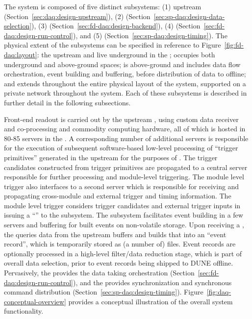 The   system is composed of five distinct subsystems:
%
(1) upstream  (Section~\ref{sec:daq:design-upstream}),
%
(2)  (Section~\ref{sec:sp-daq:design-data-selection}),
%
(3)  (Section~\ref{sec:fd-daq:design-backend}), 
%
(4)  (Section~\ref{sec:fd-daq:design-run-control}), and
%
(5)  (Section~\ref{sec:sp-daq:design-timing}).
%
The physical extent of the subsystems
can be specified in reference to Figure~\ref{fig:fd-daq:layout}: the
upstream  and   live underground in the ;  occupies
both underground and above-ground spaces;  is above-ground
and includes data flow orchestration, event building and buffering, before distribution of data
to offline; and  extends throughout the entire physical layout of the
system, supported on a private network throughout the  system. Each of these subsystems is described in further
detail in the following subsections. 

Front-end readout is carried out by the upstream , using custom data receiver and
co-processing  and commodity computing hardware, all of which is hosted in 80-85 servers in the . A
corresponding number of additional servers is responsible for the execution
of subsequent software-based low-level processing of ``trigger
primitives''
generated in the upstream  for the purposes of . The trigger candidates constructed from trigger primitives are propagated to a central server responsible
for further processing and module-level triggering. The module level
trigger also
interfaces to a second server which is responsible for receiving and
propagating cross-module and external trigger and timing
information. The module level trigger considers trigger candidates and
external trigger inputs in issuing a ``'' to the 
subsystem. The  subsystem 
facilitates event building in a few servers and buffering for built
events on non-volatile storage. Upon receiving a , the 
 queries
data from the upstream  buffers and builds that into an ``event
record'', which is temporarily stored as (a number of) files. Event records are optionally processed in a high-level
filter/data reduction stage, which is part of overall data selection,
 prior to event records being shipped to DUNE offline. Pervasively,
 the   provides the data taking orchestration
 (Section~\ref{sec:fd-daq:design-run-control}), and the
  provides synchronization and synchronous command distribution
 (Section~\ref{sec:sp-daq:design-timing}). Figure~\ref{fig:daq-conceptual-overview}
 provides a conceptual illustration of the overall  system
 functionality.%

